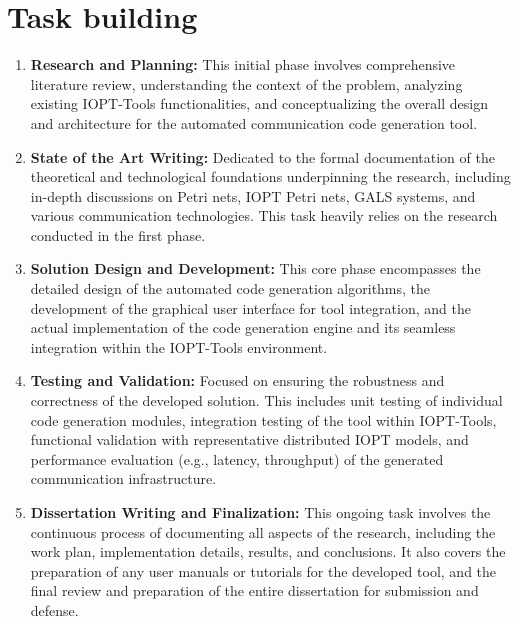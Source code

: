 \section{Task building}
\label{sec:task_building}

\begin{enumerate}
    \item \textbf{Research and Planning:} This initial phase involves comprehensive literature review, understanding the context of the problem, analyzing existing IOPT-Tools functionalities, and conceptualizing the overall design and architecture for the automated communication code generation tool.

    \item \textbf{State of the Art Writing:} Dedicated to the formal documentation of the theoretical and technological foundations underpinning the research, including in-depth discussions on Petri nets, IOPT Petri nets, GALS systems, and various communication technologies. This task heavily relies on the research conducted in the first phase.

    \item \textbf{Solution Design and Development:} This core phase encompasses the detailed design of the automated code generation algorithms, the development of the graphical user interface for tool integration, and the actual implementation of the code generation engine and its seamless integration within the IOPT-Tools environment.

    \item \textbf{Testing and Validation:} Focused on ensuring the robustness and correctness of the developed solution. This includes unit testing of individual code generation modules, integration testing of the tool within IOPT-Tools, functional validation with representative distributed IOPT models, and performance evaluation (e.g., latency, throughput) of the generated communication infrastructure.

    \item \textbf{Dissertation Writing and Finalization:} This ongoing task involves the continuous process of documenting all aspects of the research, including the work plan, implementation details, results, and conclusions. It also covers the preparation of any user manuals or tutorials for the developed tool, and the final review and preparation of the entire dissertation for submission and defense.
\end{enumerate}